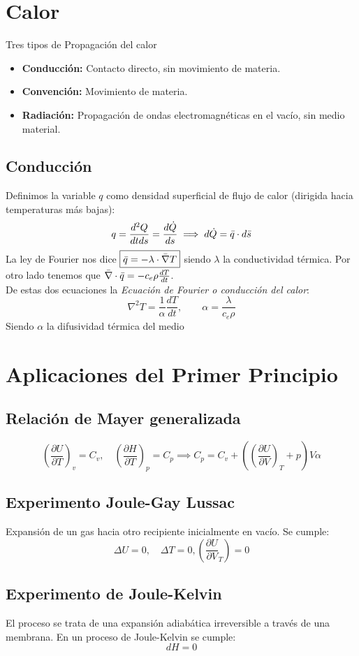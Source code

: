 \documentclass{myclass}
\begin{document}
\section{Calor}
Tres tipos de Propagación del calor
\begin{itemize}
    \item \textbf{Conducción:} Contacto directo, sin movimiento de materia.
    \item \textbf{Convención:} Movimiento de materia.
     \item \textbf{Radiación:} Propagación de ondas electromagnéticas en el vacío, sin medio material.
\end{itemize}
\subsection{Conducción}
Definimos la variable $q$ como densidad superficial de flujo de calor (dirigida hacia temperaturas más bajas):
$$
q = \frac{d^2Q}{dtds} = \frac{d\dot{Q}}{ds} \implies d\dot{Q} = \Bar{q}\cdot d\Bar{s}
$$
La ley de Fourier nos dice $\boxed{\Bar{q} = -\lambda \cdot \Bar{\nabla}T}$ siendo $\lambda$ la conductividad térmica. Por otro lado tenemos que $\Bar{\nabla}\cdot \Bar{q} = -c_e\rho\frac{dT}{dt}$. \\
De estas dos ecuaciones la \textit{Ecuación de Fourier o conducción del calor}:
$$
\boxed{\nabla^2T=\frac{1}{\alpha}\frac{dT}{dt}}, \qquad \alpha = \frac{\lambda}{c_e\rho}
$$
Siendo $\alpha$ la difusividad térmica del medio

\section{Aplicaciones del Primer Principio}
\subsection{Relación de Mayer generalizada}
\[
  \left( \frac{\partial U}{\partial T} \right)_v = C_v , \quad \left( \frac{\partial H}{\partial T} \right)_p=C_p \implies C_p=C_v + \left( \left( \frac{\partial U}{\partial V} \right)_T + p  \right)V\alpha 
\] 
\subsection{Experimento Joule-Gay Lussac}
Expansión de un gas hacia otro recipiente inicialmente en vacío. Se cumple:
\[
\Delta U = 0, \quad \Delta T=0, \left( \frac{\partial U}{\partial V}_T \right) =0
\] 

\subsection{Experimento de Joule-Kelvin}
El proceso se trata de una expansión adiabática irreversible a través de una membrana. En un proceso de Joule-Kelvin se cumple:
\[
dH=0 
\] 
\end{document}
